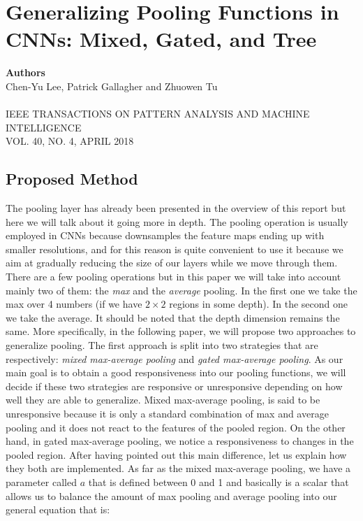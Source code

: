 \chapter{Generalizing Pooling Functions in CNNs: Mixed, Gated, and Tree}

{\small \textbf{Authors}\\
Chen-Yu Lee, Patrick Gallagher and Zhuowen Tu\\ \\
IEEE TRANSACTIONS ON PATTERN ANALYSIS AND MACHINE INTELLIGENCE\\VOL. 40, NO. 4, APRIL 2018}

\section{Proposed Method}

The pooling layer has already been presented in the overview of this report but here we will talk about it going more in depth. The pooling operation is usually employed in CNNs because downsamples the feature maps ending up with smaller resolutions, and for this reason is quite convenient to use it because we aim at gradually reducing the size of our layers while we move through them. There are a few pooling operations but in this paper we will take into account mainly two of them: the \textit{max} and the \textit{average} pooling. In the first one we take the max over 4 numbers (if we have $2 \times 2$ regions in some depth). In the second one we take the average. It should be noted that the depth dimension remains the same. More specifically, in the following paper, we will propose two approaches to generalize pooling. The first approach is split into two strategies that are respectively: \textit{mixed max-average pooling} and \textit{gated max-average pooling}. As our main goal is to obtain a good responsiveness into our pooling functions, we will decide if these two strategies are responsive or unresponsive depending on how well they are able to generalize. Mixed max-average pooling, is said to be unresponsive because it is only a standard combination of max and average pooling and it does not react to the features of the pooled region. On the other hand, in gated max-average pooling, we notice a responsiveness to changes in the pooled region. After having pointed out this main difference, let us explain how they both are implemented. As far as the mixed max-average pooling, we have a parameter called $a$ that is defined between 0 and 1 and basically is a scalar that allows us to balance the amount of max pooling and average pooling into our general equation that is:

